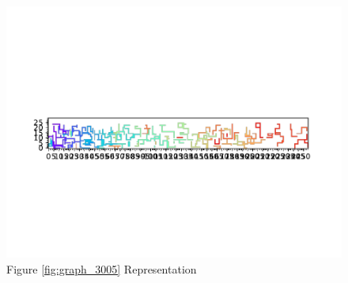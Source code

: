 \documentclass{standalone}
\begin{document}
\begin{figure}[!htb]
	\caption{Figure \ref{fig:graph_3005} Representation}
	\label{fig:picture_3005}
	\includegraphics[width=\textwidth]{../graphs/picture/3005.pdf}
\end{figure}
\end{document}
